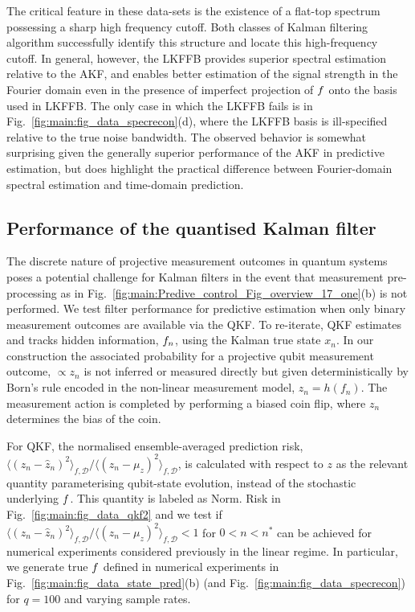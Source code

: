 The critical feature in these data-sets is the existence of a flat-top spectrum possessing a sharp high frequency cutoff.  Both classes of Kalman filtering algorithm successfully identify this structure and locate this high-frequency cutoff.  In general, however, the LKFFB provides superior spectral estimation relative to the AKF, and enables better estimation of the signal strength in the Fourier domain even in the presence of imperfect projection of $f$ onto the basis used in LKFFB.  The only case in which the LKFFB fails is in Fig.~\ref{fig:main:fig_data_specrecon}(d), where the LKFFB basis is ill-specified relative to the true noise bandwidth. The observed behavior is somewhat surprising given the generally superior performance of the AKF in predictive estimation, but does highlight the practical difference between Fourier-domain spectral estimation and time-domain prediction. 


\subsection{Performance of the quantised Kalman filter}
The discrete nature of projective measurement outcomes in quantum systems poses a potential challenge for Kalman filters in the event that measurement pre-processing as in Fig.~\ref{fig:main:Predive_control_Fig_overview_17_one}(b) is not performed.  We test filter performance for predictive estimation when only binary measurement outcomes are available via the QKF.  To re-iterate, QKF estimates and tracks hidden information, $f_n$, using the Kalman true state $x_n$.  In our construction the associated probability for a projective qubit measurement outcome, $\propto z_n$ is not inferred or measured directly but given deterministically by Born's rule encoded in the non-linear measurement model, $z_n = h(f_n)$. The measurement action is completed by performing a biased coin flip, where $z_n$ determines the bias of the coin.  

For QKF, the normalised ensemble-averaged prediction risk, $ \langle (z_n - \hat{z}_n)^2 \rangle_{f, \mathcal{D}} / \langle (z_n - \mu_z)^2 \rangle_{f, \mathcal{D}}$, is calculated with respect to $z$ as the relevant quantity parameterising qubit-state evolution, instead of the stochastic underlying $f$. This quantity is labeled as Norm. Risk in Fig.~\ref{fig:main:fig_data_qkf2} and we test if $ \langle (z_n - \hat{z}_n)^2 \rangle_{f, \mathcal{D}} / \langle (z_n - \mu_z)^2 \rangle_{f, \mathcal{D}} < 1$ for $0< n < n^*$ can be achieved for numerical experiments considered previously in the linear regime. In particular, we generate true $f$ defined in numerical experiments in Fig.~\ref{fig:main:fig_data_state_pred}(b) (and Fig.~\ref{fig:main:fig_data_specrecon}) for $q=100$ and varying sample rates.

